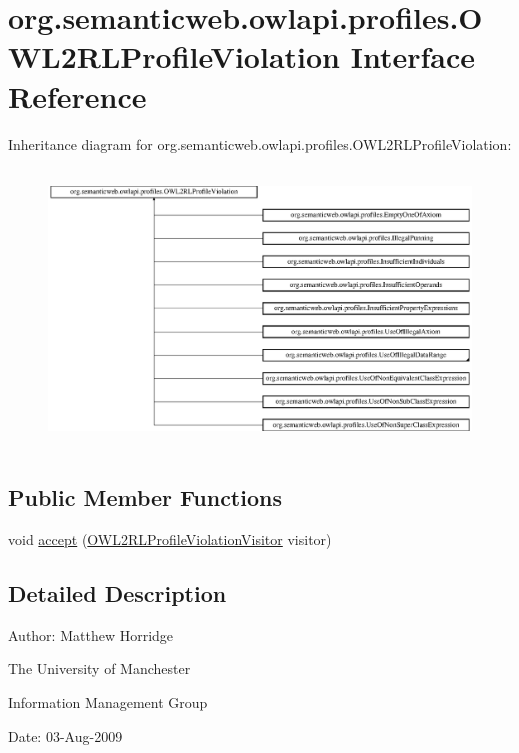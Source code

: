 \hypertarget{interfaceorg_1_1semanticweb_1_1owlapi_1_1profiles_1_1_o_w_l2_r_l_profile_violation}{\section{org.\-semanticweb.\-owlapi.\-profiles.\-O\-W\-L2\-R\-L\-Profile\-Violation Interface Reference}
\label{interfaceorg_1_1semanticweb_1_1owlapi_1_1profiles_1_1_o_w_l2_r_l_profile_violation}
}
Inheritance diagram for org.\-semanticweb.\-owlapi.\-profiles.\-O\-W\-L2\-R\-L\-Profile\-Violation\-:\begin{figure}[H]
\begin{center}
\leavevmode
\includegraphics[height=7.439613cm]{interfaceorg_1_1semanticweb_1_1owlapi_1_1profiles_1_1_o_w_l2_r_l_profile_violation}
\end{center}
\end{figure}
\subsection*{Public Member Functions}
\begin{DoxyCompactItemize}
\item 
void \hyperlink{interfaceorg_1_1semanticweb_1_1owlapi_1_1profiles_1_1_o_w_l2_r_l_profile_violation_ab3b6f38a4eb31f9a91f7cfc564aea282}{accept} (\hyperlink{interfaceorg_1_1semanticweb_1_1owlapi_1_1profiles_1_1_o_w_l2_r_l_profile_violation_visitor}{O\-W\-L2\-R\-L\-Profile\-Violation\-Visitor} visitor)
\end{DoxyCompactItemize}


\subsection{Detailed Description}
Author\-: Matthew Horridge\par
 The University of Manchester\par
 Information Management Group\par
 Date\-: 03-\/\-Aug-\/2009 

